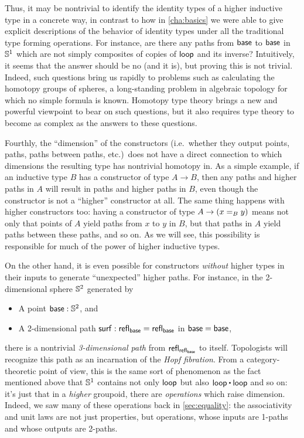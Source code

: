 Thus, it may be nontrivial to identify the identity types of a higher inductive type in a concrete way, in contrast to how in \autoref{cha:basics} we were able to give explicit descriptions of the behavior of identity types under all the traditional type forming operations.
For instance, are there any paths from $\base$ to $\base$ in $\Sn^1$ which are not simply composites of copies of $\lloop$ and its inverse?
Intuitively, it seems that the answer should be no (and it is), but proving this is not trivial.
Indeed, such questions bring us rapidly to problems such as calculating the homotopy groups of spheres, a long-standing problem in algebraic topology for which no simple formula is known.
Homotopy type theory brings a new and powerful viewpoint to bear on such questions, but it also requires type theory to become as complex as the answers to these questions.

Fourthly, the ``dimension'' of the constructors (i.e.\ whether they output points, paths, paths between paths, etc.)\ does not have a direct connection to which dimensions the resulting type has nontrivial homotopy in.
As a simple example, if an inductive type $B$ has a constructor of type $A\to B$, then any paths and higher paths in $A$ will result in paths and higher paths in $B$, even though the constructor is not a ``higher'' constructor at all.
The same thing happens with higher constructors too: having a constructor of type $A\to (\id[B]xy)$ means not only that points of $A$ yield paths from $x$ to $y$ in $B$, but that paths in $A$ yield paths between these paths, and so on.
As we will see, this possibility is responsible for much of the power of higher inductive types.

On the other hand, it is even possible for constructors \emph{without} higher types in their inputs to generate ``unexpected'' higher paths.
For instance, in the 2-dimensional sphere $\Sn^2$ generated by
\begin{itemize}
\item A point $\base:\Sn^2$, and
\item A 2-dimensional path $\surf:\refl{\base} = \refl{\base}$ in ${\base=\base}$,
\end{itemize}
there is a nontrivial \emph{3-dimensional path} from $\refl{\refl{\base}}$ to itself.
Topologists will recognize this path as an incarnation of the \emph{Hopf fibration}.
From a category-theoretic point of view, this is the same sort of phenomenon as the fact mentioned above that $\Sn^1$ contains not only $\lloop$ but also $\lloop\ct\lloop$ and so on: it's just that in a \emph{higher} groupoid, there are \emph{operations} which raise dimension.
Indeed, we saw many of these operations back in \autoref{sec:equality}: the associativity and unit laws are not just properties, but operations, whose inputs are 1-paths and whose outputs are 2-paths.


